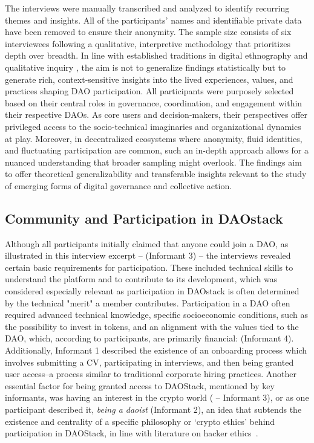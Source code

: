 \documentclass[10pt,lineno]{wlpeerj}
\begin{document}
The interviews were manually transcribed and analyzed to identify recurring themes and insights. All of the participants’ names and identifiable private data have been removed to ensure their anonymity. The sample size consists of six interviewees following a qualitative, interpretive methodology that prioritizes depth over breadth.
In line with established traditions in digital ethnography and qualitative inquiry \citep{geertz1973aage, hine2020ethnography}, the aim is not to generalize findings statistically but to generate rich, context-sensitive insights into the lived experiences, values, and practices shaping DAO participation. All participants were purposely selected based on their central roles in governance, coordination, and engagement within their respective DAOs. As core users and decision-makers, their perspectives offer privileged access to the socio-technical imaginaries and organizational dynamics at play. Moreover, in decentralized ecosystems where anonymity, fluid identities, and fluctuating participation are common, such an in-depth approach allows for a nuanced understanding that broader sampling might overlook. The findings aim to offer theoretical generalizability and transferable insights relevant to the study of emerging forms of digital governance and collective action.


\subsection{Community and Participation in DAOstack}

Although all participants initially claimed that anyone could join a DAO, as illustrated in this interview excerpt --  (Informant 3) -- the interviews revealed certain basic requirements for participation. These included technical skills to understand the platform and to contribute to its development, which was considered especially relevant as participation in DAOstack is often determined by the technical "merit" a member contributes. Participation in a DAO often required advanced technical knowledge, specific socioeconomic conditions, such as the possibility to invest in tokens, and an alignment with the values tied to the DAO, which, according to participants, are primarily financial:  (Informant 4). Additionally, Informant 1 described the existence of an onboarding process which involves submitting a CV, participating in interviews, and then being granted user access--a process similar to traditional corporate hiring practices. Another essential factor for being granted access to DAOStack, mentioned by key informants, was having an interest in the crypto world ( -- Informant 3), or as one participant described it, \textquote
{\emph{being a daoist}} (Informant 2), an idea that subtends the existence and centrality of a specific philosophy or `crypto ethics’ behind participation in DAOStack, in line with literature on hacker ethics~\citep{Levy1984}.
\end{document}

